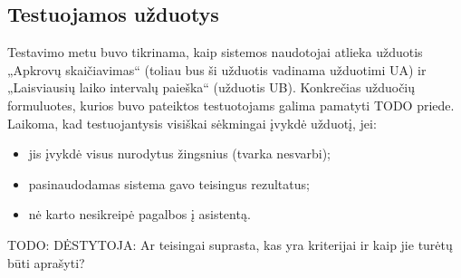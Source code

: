 


\subsection{Testuojamos užduotys}

Testavimo metu buvo tikrinama, kaip sistemos naudotojai atlieka užduotis
„Apkrovų skaičiavimas“ (toliau bus ši užduotis vadinama užduotimi UA) ir 
„Laisviausių laiko intervalų paieška“ (užduotis UB).
Konkrečias užduočių formuluotes, kurios buvo pateiktos testuotojams
galima pamatyti TODO priede. Laikoma, kad testuojantysis visiškai sėkmingai
įvykdė užduotį, jei:
\begin{itemize}
  \item jis įvykdė visus nurodytus žingsnius (tvarka nesvarbi);
  \item pasinaudodamas sistema gavo teisingus rezultatus;
  \item nė karto nesikreipė pagalbos į asistentą.
\end{itemize}
TODO: DĖSTYTOJA: Ar teisingai suprasta, kas yra kriterijai ir kaip jie
turėtų būti aprašyti?

